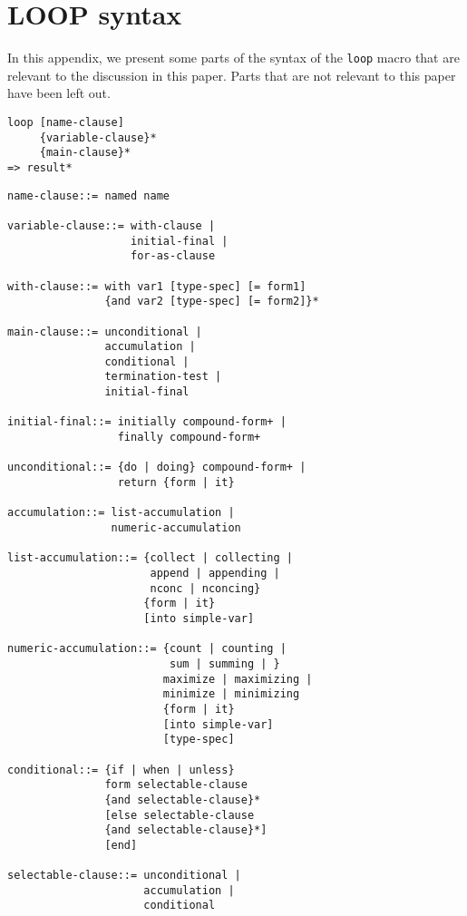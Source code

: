\appendix

\section{LOOP syntax}
\label{loop-syntax}

In this appendix, we present some parts of the syntax of the
\texttt{loop} macro that are relevant to the discussion in this paper.
Parts that are not relevant to this paper have been left out.

\begin{verbatim}
loop [name-clause] 
     {variable-clause}* 
     {main-clause}* 
=> result*
\end{verbatim}

\begin{verbatim}
name-clause::= named name 

variable-clause::= with-clause | 
                   initial-final | 
                   for-as-clause 

with-clause::= with var1 [type-spec] [= form1] 
               {and var2 [type-spec] [= form2]}* 

main-clause::= unconditional | 
               accumulation | 
               conditional | 
               termination-test | 
               initial-final 

initial-final::= initially compound-form+ | 
                 finally compound-form+ 

unconditional::= {do | doing} compound-form+ | 
                 return {form | it} 

accumulation::= list-accumulation | 
                numeric-accumulation 

list-accumulation::= {collect | collecting | 
                      append | appending | 
                      nconc | nconcing} 
                     {form | it}  
                     [into simple-var] 

numeric-accumulation::= {count | counting | 
                         sum | summing | } 
                        maximize | maximizing | 
                        minimize | minimizing 
                        {form | it} 
                        [into simple-var] 
                        [type-spec] 

conditional::= {if | when | unless} 
               form selectable-clause 
               {and selectable-clause}*  
               [else selectable-clause 
               {and selectable-clause}*]  
               [end] 

selectable-clause::= unconditional | 
                     accumulation | 
                     conditional 


\end{verbatim}
